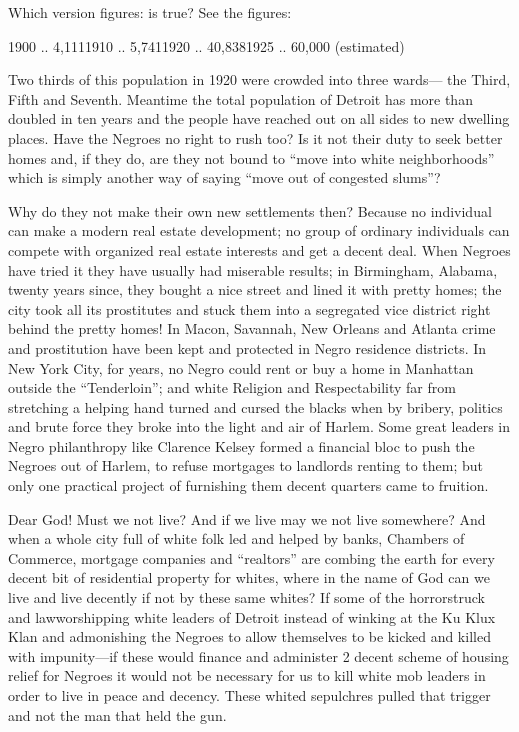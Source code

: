 \documentclass[letterpaper,10pt,english]{jupyterBook}
\begin{document}
\sphinxAtStartPar
Which version figures: is true? See the figures:

\sphinxAtStartPar
{}

\sphinxAtStartPar
{}1900 .. 4,1111910 .. 5,7411920 .. 40,8381925 .. 60,000 (estimated)

\sphinxAtStartPar
Two thirds of this population in 1920 were crowded into three wards— the Third, Fifth and Seventh. Meantime the total population of Detroit has more than doubled in ten years and the people have reached out on all sides to new dwelling places. Have the Negroes no right to rush too? Is it not their duty to seek better homes and, if they do, are they not bound to “move into white neighborhoods” which is simply another way of saying “move out of congested slums”?

\sphinxAtStartPar
Why do they not make their own new settlements then? Because no individual can make a modern real estate development; no group of ordinary individuals can compete with organized real estate interests and get a decent deal. When Negroes have tried it they have usually had miserable results; in Birmingham, Alabama, twenty years since, they bought a nice street and lined it with pretty homes; the city took all its prostitutes and stuck them into a segregated vice district right behind the pretty homes! In Macon, Savannah, New Orleans and Atlanta crime and prostitution have been kept and protected in Negro residence districts. In New York City, for years, no Negro could rent or buy a home in Manhattan outside the “Tenderloin”; and white Religion and Respectability far from stretching a helping hand turned and cursed the blacks when by bribery, politics and brute force they broke into the light and air of Harlem. Some great leaders in Negro philanthropy like Clarence Kelsey formed a financial bloc to push the Negroes out of Harlem, to refuse mortgages to landlords renting to them; but only one practical project of furnishing them decent quarters came to fruition.



\sphinxAtStartPar
Dear God! Must we not live? And if we live may we not live somewhere? And when a whole city full of white folk led and helped by banks, Chambers of Commerce, mortgage companies and “realtors” are combing the earth for every decent bit of residential property for whites, where in the name of God can we live and live decently if not by these same whites? If some of the horror\sphinxhyphen{}struck and law\sphinxhyphen{}worshipping white leaders of Detroit instead of winking at the Ku Klux Klan and admonishing the Negroes to allow themselves to be kicked and killed with impunity—if these would finance and administer 2 decent scheme of housing relief for Negroes it would not be necessary for us to kill white mob leaders \sphinxhyphen{}in order to live in peace and decency. These whited sepulchres pulled that trigger and not the man that held the gun.
\end{document}

